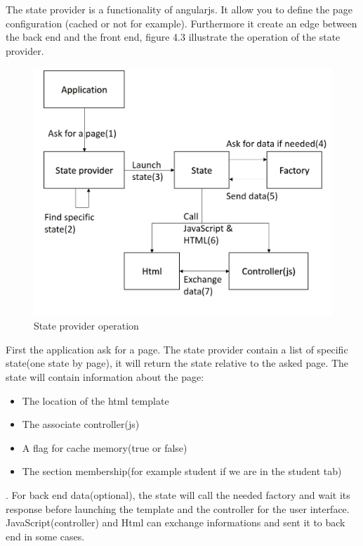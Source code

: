 \documentclass{eplmastersthesis}
\begin{document}
The state provider is a functionality of angularjs. It allow you to define the page configuration (cached or not for example). Furthermore it create an edge between the back end and the front end, figure 4.3 illustrate the operation of the state provider. 
\begin{figure}[H]
\centering
\includegraphics[scale = 0.3]{Images/stateProvider_arch.png}
\caption{State provider operation}
\end{figure}
First the application ask for a page. The state provider contain a list of specific state(one state by page), it will return the state relative to the asked page. The state will contain information about the page:
\begin{itemize}
\item The location of the html template
\item The associate controller(js)
\item A flag for cache memory(true or false)
\item The section membership(for example student if we are in the student tab)
\end{itemize}. For back end data(optional), the state will call the needed factory and wait its response before launching the template and the controller for the user interface. JavaScript(controller) and Html can exchange informations and sent it to back end in some cases.

\end{document}
